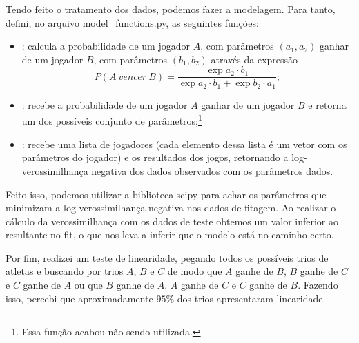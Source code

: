 \documentclass{article}
\begin{document}
Tendo feito o tratamento dos dados, podemos fazer a modelagem. Para tanto, defini, no arquivo {\selectfont model\_functions.py}, as seguintes funções:
\begin{itemize}
    \item
        : calcula a probabilidade de um jogador $A$, com parâmetros $(a_1, a_2)$ ganhar de um jogador $B$, com parâmetros $(b_1, b_2)$ através da expressão
        \[P\left(A ~ vencer ~ B\right) = \frac{\exp{a_2\cdot b_1}}{\exp{a_2\cdot b_1} + \exp{b_2\cdot a_1}};\]
        
    \item
        : recebe a probabilidade de um jogador $A$ ganhar de um jogador $B$ e retorna um dos possíveis conjunto de parâmetros;\footnote{Essa função acabou não sendo utilizada.}
        
    \item
        : recebe uma lista de jogadores (cada elemento dessa lista é um vetor com os parâmetros do jogador) e os resultados dos jogos, retornando a log-verossimilhança negativa dos dados observados com os parâmetros dados.
\end{itemize}

Feito isso, podemos utilizar a biblioteca {\selectfont scipy} para achar os parâmetros que minimizam a log-verossimilhança negativa nos dados de fitagem. Ao realizar o cálculo da verossimilhança com os dados de teste obtemos um valor inferior ao resultante no fit, o que nos leva a inferir que o modelo está no caminho certo.

Por fim, realizei um teste de linearidade, pegando todos os possíveis trios de atletas e buscando por trios $A$, $B$ e $C$ de modo que $A$ ganhe de $B$, $B$ ganhe de $C$ e $C$ ganhe de $A$ ou que $B$ ganhe de $A$, $A$ ganhe de $C$ e $C$ ganhe de $B$. Fazendo isso, percebi que aproximadamente $95\%$ dos trios apresentaram linearidade.

\printbibliography
\end{document}
